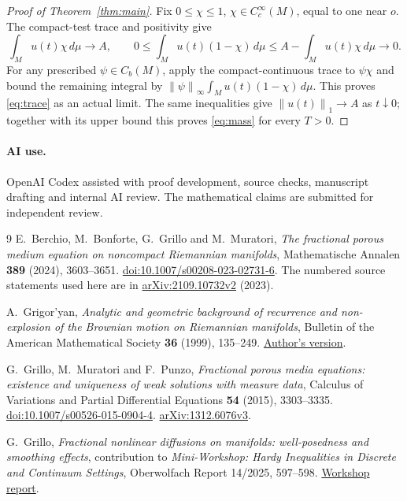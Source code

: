 \documentclass[11pt]{article}
\theoremstyle{remark}
\newcommand{\dd}{\,d\mu}
\newcommand{\norm}[1]{\left\lVert#1\right\rVert}
\begin{document}
\begin{proof}[Proof of Theorem~\ref{thm:main}]
Fix $0\le\chi\le1$, $\chi\in C_c^\infty(M)$, equal to one near $o$.
The compact-test trace and positivity give
\[
 \int_Mu(t)\chi\dd\longrightarrow A,\qquad
 0\le\int_Mu(t)(1-\chi)\dd
       \le A-\int_Mu(t)\chi\dd\longrightarrow0.
\]
For any prescribed $\psi\in C_b(M)$, apply the compact-continuous trace
to $\psi\chi$ and bound the remaining integral by
$\norm\psi_\infty\int_Mu(t)(1-\chi)\dd$. This proves
\eqref{eq:trace} as an actual limit. The same inequalities give
$\norm{u(t)}_1\to A$ as $t\downarrow0$; together with its upper bound
this proves \eqref{eq:mass} for every $T>0$.
\end{proof}

\paragraph{AI use.}
OpenAI Codex assisted with proof development, source checks, manuscript
drafting and internal AI review. The mathematical claims are submitted for
independent review.

\begin{thebibliography}{9}
E.~Berchio, M.~Bonforte, G.~Grillo and M.~Muratori,
\emph{The fractional porous medium equation on noncompact Riemannian manifolds},
Mathematische Annalen \textbf{389} (2024), 3603--3651.
\href{https://doi.org/10.1007/s00208-023-02731-6}{doi:10.1007/s00208-023-02731-6}.
The numbered source statements used here are in
\href{https://arxiv.org/abs/2109.10732v2}{arXiv:2109.10732v2} (2023).

A.~Grigor'yan,
\emph{Analytic and geometric background of recurrence and non-explosion
of the Brownian motion on Riemannian manifolds},
Bulletin of the American Mathematical Society \textbf{36} (1999), 135--249.
\href{https://www.math.uni-bielefeld.de/~grigor/recor.pdf}{Author's version}.

G.~Grillo, M.~Muratori and F.~Punzo,
\emph{Fractional porous media equations: existence and uniqueness of weak
solutions with measure data},
Calculus of Variations and Partial Differential Equations \textbf{54}
(2015), 3303--3335.
\href{https://doi.org/10.1007/s00526-015-0904-4}{doi:10.1007/s00526-015-0904-4}.
\href{https://arxiv.org/abs/1312.6076v3}{arXiv:1312.6076v3}.

G.~Grillo,
\emph{Fractional nonlinear diffusions on manifolds: well-posedness and
smoothing effects}, contribution to \emph{Mini-Workshop: Hardy Inequalities
in Discrete and Continuum Settings}, Oberwolfach Report 14/2025,
597--598.
\href{https://ems.press/content/serial-article-files/51358?nt=1}{Workshop report}.
\end{thebibliography}
\end{document}
